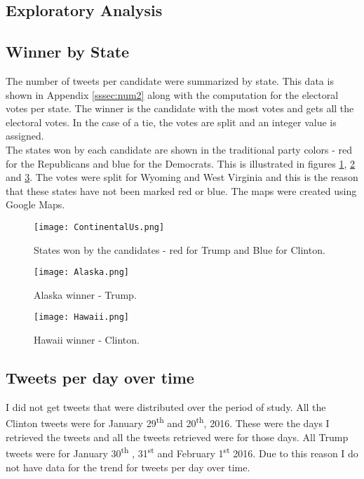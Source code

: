 \documentclass{sig-alternate-05-2015}
\begin{document}
\subsection{Exploratory Analysis}
\subsection{Winner by State}
The number of tweets per candidate were summarized by state. This data is shown in Appendix \ref{sssec:num2}  along with the computation for the electoral votes per state. The winner is the candidate with the most votes and gets all the electoral votes. In the case of a tie, the votes are split and an integer value is assigned.\\

The states won by each candidate are shown in the traditional party colors - red for the Republicans and blue for the Democrats. This is illustrated in figures \ref{ContinentalUs}, \ref{Alaska} and \ref{Hawaii}. The votes were split for Wyoming and West Virginia and this is the reason that these states have not been marked red or blue. The maps were created using Google Maps.\\

\begin{figure}
\centering
\texttt{[image: ContinentalUs.png]}
\caption{States won by the candidates - red for Trump and Blue for Clinton.}
\label{ContinentalUs}
\end{figure}

\begin{figure}
\centering
\texttt{[image: Alaska.png]}
\caption{Alaska winner - Trump.}
\label{Alaska}
\end{figure}

\begin{figure}
\centering
\texttt{[image: Hawaii.png]}
\caption{Hawaii winner - Clinton.}
\label{Hawaii}
\end{figure}

\subsection{Tweets per day over time}
I did not get tweets that were distributed over the period of study. All the Clinton tweets were for January 29\textsuperscript{th} and 20\textsuperscript{th}, 2016. These were the days I retrieved the tweets and all the tweets retrieved were for those days. All Trump tweets were for January 30\textsuperscript{th} , 31\textsuperscript{st} and February 1\textsuperscript{st} 2016. Due to this reason I do not have data for the trend for tweets per day over time.
\end{document}
